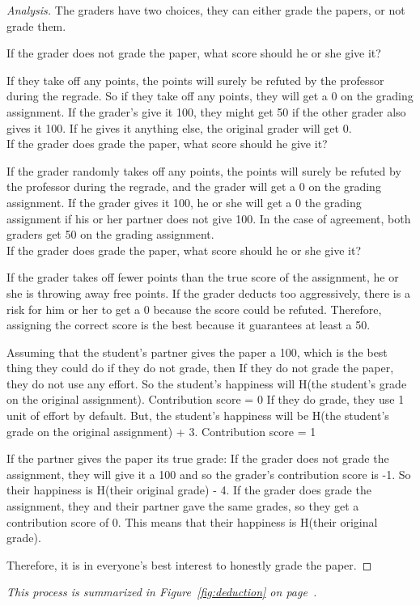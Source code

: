 \documentclass[12pt, Arial]{article}
\begin{document}
\begin{proof}[Analysis]
The graders have two choices, they can either grade the papers, or not grade them.

If the grader does not grade the paper, what score should he or she give it?

If they take off any points, the points will surely be refuted by the professor during the regrade.
So if they take off any points, they will get a 0 on the grading assignment.
If the grader's give it 100, they might get 50 if the other grader also gives it 100. If he gives it anything else, the original grader will get 0.\\
If the grader does grade the paper, what score should he give it?

If the grader randomly takes off any points, the points will surely be refuted by the professor during the regrade, and the grader will get a 0 on the grading assignment.
If the grader gives it 100, he or she will get a 0 the grading assignment if his or her partner does not give 100. In the case of agreement, both graders get 50 on the grading assignment.\\
If the grader does grade the paper, what score should he or she give it?

If the grader takes off fewer points than the true score of the assignment, he or she is throwing away free points. If the grader deducts too aggressively, there is a risk for him or her to get a 0 because the score could be refuted. 
Therefore, assigning the correct score is the best because it guarantees at least a 50.

Assuming that the student's partner gives the paper a 100, which is the best thing they could do if they do not grade, then
	If they do not grade the paper, they do not use any effort. So the student's happiness will H(the student's grade on the original assignment). Contribution score = 0
	If they do grade, they use 1 unit of effort by default. But, the student's happiness will be H(the student's grade on the original assignment) + 3. Contribution score = 1
	
If the partner gives the paper its true grade:
	If the grader does not grade the assignment, they will give it a 100 and so the grader's contribution score is -1. So their happiness is H(their original grade) - 4.
	If the grader does grade the assignment, they and their partner gave the same grades, so they get a contribution score of 0. This means that their happiness is H(their original grade). 
	
Therefore, it is in everyone's best interest to honestly grade the paper.

\end{proof}
\emph{This process is summarized in Figure~\ref{fig:deduction} on page~\pageref{fig:deduction}.}
\end{document}
